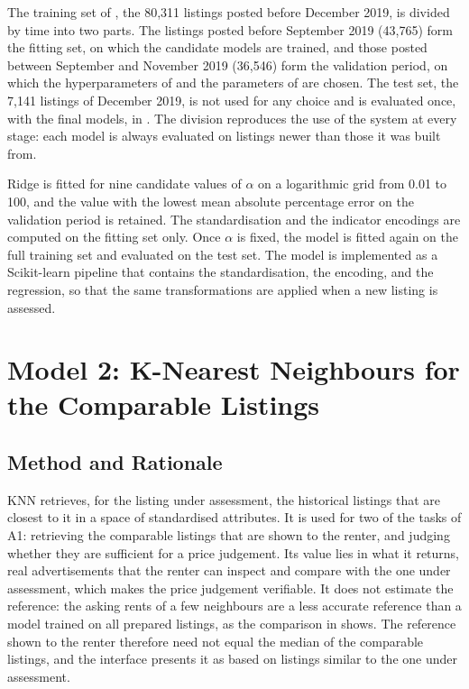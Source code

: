 \documentclass[12pt,a4paper]{report}
\begin{document}
The training set of , the 80,311 listings posted
before December 2019, is divided by time into two parts. The listings posted
before September 2019 (43,765) form the fitting set, on which the candidate
models are trained, and those posted between September and November 2019
(36,546) form the validation period, on which the hyperparameters of
 and the parameters of  are
chosen. The test set, the 7,141 listings of December 2019, is not used for
any choice and is evaluated once, with the final models, in
. The division reproduces the use of the system at every
stage: each model is always evaluated on listings newer than those it was
built from.

Ridge is fitted for nine candidate values of $\alpha$ on a logarithmic grid
from 0.01 to 100, and the value with the lowest mean absolute percentage error on the
validation period is retained. The standardisation and the indicator
encodings are computed on the fitting set only. Once $\alpha$ is fixed, the
model is fitted again on the full training set and evaluated on the test
set. The model is implemented as a Scikit-learn pipeline that contains the
standardisation, the encoding, and the regression, so that the same
transformations are applied when a new listing is assessed.

\section{Model 2: K-Nearest Neighbours for the Comparable Listings}
\label{sec:knn}

\subsection{Method and Rationale}

KNN retrieves, for the listing under assessment, the historical listings
that are closest to it in a space of standardised attributes. It is used for
two of the tasks of A1: retrieving the comparable listings that are shown to
the renter, and judging whether they are sufficient for a price judgement.
Its value lies in what it returns, real advertisements that the renter can
inspect and compare with the one under assessment, which makes the price
judgement verifiable. It does not estimate the reference: the asking rents of
a few neighbours are a less accurate reference than a model trained on all
prepared listings, as the comparison in  shows. The
reference shown to the renter therefore need not equal the median of the
comparable listings, and the interface presents it as based on listings
similar to the one under assessment.
\end{document}
